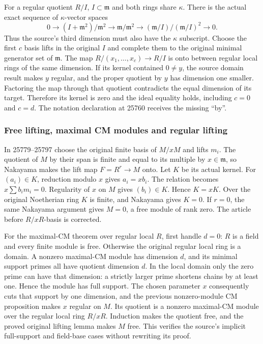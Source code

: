 For a regular quotient \(R/I\), \(I\subset\mathfrak m\) and both rings share \(\kappa\). There is the actual exact sequence of \(\kappa\)-vector spaces \[
 0\longrightarrow (I+\mathfrak m^2)/\mathfrak m^2
 \longrightarrow \mathfrak m/\mathfrak m^2
 \longrightarrow (\mathfrak m/I)/(\mathfrak m/I)^2\longrightarrow0 .
\] Thus the source's third dimension must also have the \(\kappa\) subscript. Choose the first \(c\) basis lifts in the original \(I\) and complete them to the original minimal generator set of \(\mathfrak m\). The map \(R/(x_1,\ldots,x_c)\to R/I\) is onto between regular local rings of the same dimension. If its kernel contained \(0\ne y\), the source domain result makes \(y\) regular, and the proper quotient by \(y\) has dimension one smaller. Factoring the map through that quotient contradicts the equal dimension of its target. Therefore its kernel is zero and the ideal equality holds, including \(c=0\) and \(c=d\). The notation declaration at 25760 receives the missing ``by''.

\subsubsection{Free lifting, maximal CM modules and regular lifting}\label{free-lifting-maximal-cm-modules-and-regular-lifting}

In 25779--25797 choose the original finite basis of \(M/xM\) and lifts \(m_i\). The quotient of \(M\) by their span is finite and equal to its multiple by \(x\in\mathfrak m\), so Nakayama makes the lift map \(F=R^r\to M\) onto. Let \(K\) be its actual kernel. For \((a_i)\in K\), reduction modulo \(x\) gives \(a_i=xb_i\). The relation becomes \(x\sum b_im_i=0\). Regularity of \(x\) on \(M\) gives \((b_i)\in K\). Hence \(K=xK\). Over the original Noetherian ring \(K\) is finite, and Nakayama gives \(K=0\). If \(r=0\), the same Nakayama argument gives \(M=0\), a free module of rank zero. The article before \(R/xR\)-basis is corrected.

For the maximal-CM theorem over regular local \(R\), first handle \(d=0\): \(R\) is a field and every finite module is free. Otherwise the original regular local ring is a domain. A nonzero maximal-CM module has dimension \(d\), and its minimal support primes all have quotient dimension \(d\). In the local domain only the zero prime can have that dimension: a strictly larger prime shortens chains by at least one. Hence the module has full support. The chosen parameter \(x\) consequently cuts that support by one dimension, and the previous nonzero-module CM proposition makes \(x\) regular on \(M\). Its quotient is a nonzero maximal-CM module over the regular local ring \(R/xR\). Induction makes the quotient free, and the proved original lifting lemma makes \(M\) free. This verifies the source's implicit full-support and field-base cases without rewriting its proof.

